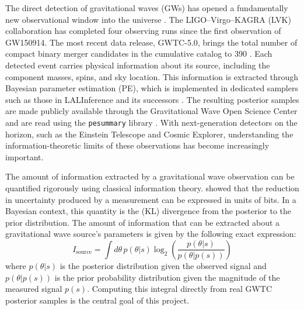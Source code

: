 \documentclass{phys400finalreport}
\begin{document}
\makeproposalcover
\newpage

\introduction

The direct detection of gravitational waves (GWs) has opened a fundamentally
new observational window into the universe \citep{Abbott2016}. The
LIGO--Virgo--KAGRA (LVK) collaboration has completed four observing runs since
the first observation of GW150914. The most recent data release, GWTC-5.0,
brings the total number of compact binary merger candidates in the cumulative
catalog to 390
\citep{theligoscientificcollaboration2026gwtc50observationssecondfourth}. Each
detected event carries physical information about its
source, including the component masses, spins, and sky location. This
information is extracted through Bayesian parameter estimation (PE), which is
implemented in dedicated samplers such as those in LALInference and its
successors \citep{Veitch2015}. The resulting posterior samples are made
publicly available through the Gravitational Wave Open Science Center
\citep{ligo_scientific_collaboration_and_virgo_2023_8177023} and are read
using the \texttt{pesummary} library \citep{Hoy2021}. With next-generation
detectors on the horizon, such as the Einstein Telescope and Cosmic Explorer,
understanding the information-theoretic limits of these observations has become
increasingly important.

The amount of information extracted by a gravitational wave observation can be
quantified rigorously using classical information theory. \citet{Shannon1948}
showed that the reduction in uncertainty produced by a measurement can be
expressed in units of bits. In a Bayesian context, this quantity is the
\citet{1320776d-9e76-337e-a755-73010b6e4b64} (KL) divergence from the posterior
to the prior distribution. The amount of information that can be extracted
about a gravitational wave source's parameters is given by the following exact
expression:
\begin{equation}
I_\mathrm{source} = \int d\theta\, p(\theta | s) \log_2\left(\frac{p(\theta | s)}{p(\theta | p(s))}\right)
\label{eq:exact_info}
\end{equation}
where $p(\theta | s)$ is the posterior distribution given the observed signal
and $p(\theta | p(s))$ is the prior probability distribution given the
magnitude of the measured signal $p(s)$. Computing this integral directly from
real GWTC posterior samples is the central goal of this project.
\end{document}

